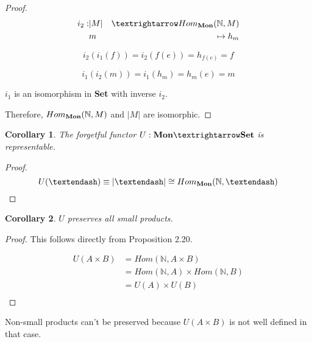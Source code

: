 \documentclass[notitlepage,a4paper]{article}
\newtheorem{corollary}{Corollary}
\begin{document}
\begin{enumerate}
\begin{proof}
      \begin{eqnarray*}
        i_2 : &  \vert M \vert & →      Hom_{\text{\bf Mon}}(\mathbb{N}, M) \\
            &        m        & \mapsto  h_m                          \\
      \end{eqnarray*}

      $$i_2(i_1(f)) = i_2(f(e)) = h_{f(e)} = f$$ 

      $$i_1(i_2(m)) = i_1(h_m) = h_m(e) = m$$

      $i_1$ is an isomorphism in {\bf Set} with inverse $i_2$.

      Therefore, $Hom_{\text{\bf Mon}}(\mathbb{N}, M)$ and $\vert M \vert$ are
      isomorphic.
      
    \end{proof}

    \begin{corollary}
      The forgetful functor $U : \text{\bf Mon} → \text{\bf Set}$
      is representable.

    \end{corollary}
    \begin{proof}
      
      $$U(–) \equiv \vert – \vert \cong Hom_{\text{\bf Mon}}(\mathbb{N}, –)$$
    \end{proof}

    \begin{corollary}
      $U$ preserves all small products.
    \end{corollary}

    \begin{proof}

      This follows directly from Proposition 2.20.

      \begin{align*}
       U(A \times B) &= Hom(\mathbb{N}, A \times B) \\
                     &= Hom(\mathbb{N}, A) \times Hom(\mathbb{N}, B) \\
                     &= U(A) \times U(B) \\
      \end{align*}

    \end{proof}

      Non-small products can't be preserved because $U(A \times B)$
      is not well defined in that case.

\end{enumerate}
\end{document}
